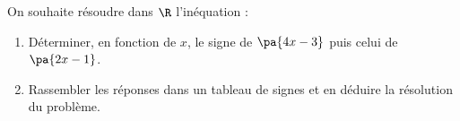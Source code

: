 \begin{exo}{}
	On souhaite résoudre dans $\R$ l'inéquation : 
	\begin{enumerate}
		\item Déterminer, en fonction de $x$, le signe de $\pa{4x - 3}$ puis celui de $\pa{2x - 1}$.
		\item Rassembler les réponses dans un tableau de signes et en déduire la résolution du problème.
	\end{enumerate}
\end{exo}
